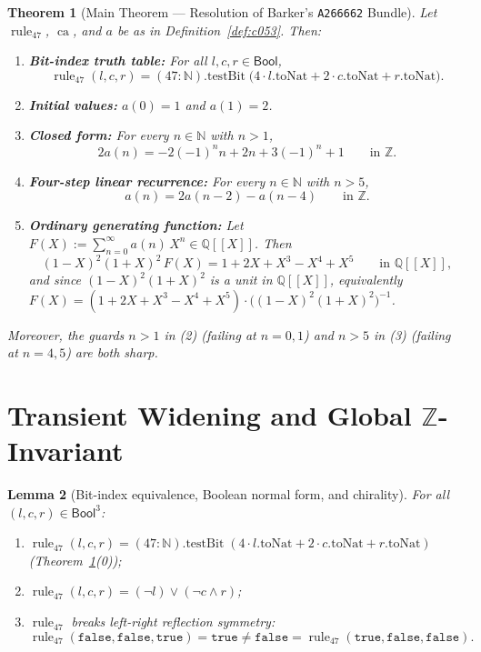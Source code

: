 \documentclass[11pt]{article}
\newcommand{\llbracket}{[\![}
\newcommand{\rrbracket}{]\!]}
\newtheorem{theorem}{Theorem}[section]
\newtheorem{lemma}[theorem]{Lemma}
\theoremstyle{definition}
\newcommand{\N}{\mathbb{N}}
\newcommand{\Z}{\mathbb{Z}}
\newcommand{\Q}{\mathbb{Q}}
\newcommand{\seq}[1]{\texttt{#1}}
\newcommand{\ruleFS}{\operatorname{rule}_{47}}
\newcommand{\ca}{\operatorname{ca}}
\begin{document}
\begin{theorem}[Main Theorem --- Resolution of Barker's \seq{A266662} Bundle]
\label{thm:main}
Let $\ruleFS$, $\ca$, and $a$ be as in Definition~\ref{def:c053}. Then:
\begin{enumerate}
\item[\textup{(0)}] \textbf{Bit-index truth table:} For all $l, c, r \in \mathsf{Bool}$,
\[
\ruleFS(l, c, r) = (47 : \N).\mathrm{testBit}\;\bigl(4 \cdot l.\mathrm{toNat} + 2 \cdot c.\mathrm{toNat} + r.\mathrm{toNat}\bigr).
\]
\item[\textup{(1)}] \textbf{Initial values:} $a(0) = 1$ and $a(1) = 2$.
\item[\textup{(2)}] \textbf{Closed form:} For every $n \in \N$ with $n > 1$,
\[
2 a(n) = -2(-1)^n n + 2n + 3(-1)^n + 1 \qquad \text{in }\Z.
\]
\item[\textup{(3)}] \textbf{Four-step linear recurrence:} For every $n \in \N$ with $n > 5$,
\[
a(n) = 2a(n - 2) - a(n - 4) \qquad \text{in }\Z.
\]
\item[\textup{(4)}] \textbf{Ordinary generating function:} Let $F(X) := \sum_{n=0}^{\infty} a(n)\,X^n \in \Q\llbracket X \rrbracket$. Then
\[
(1 - X)^2 (1 + X)^2 \, F(X) = 1 + 2X + X^3 - X^4 + X^5 \qquad \text{in }\Q\llbracket X \rrbracket,
\]
and since $(1 - X)^2(1 + X)^2$ is a unit in $\Q\llbracket X \rrbracket$, equivalently $F(X) = (1 + 2X + X^3 - X^4 + X^5)\cdot \bigl((1 - X)^2(1 + X)^2\bigr)^{-1}$.
\end{enumerate}
Moreover, the guards $n > 1$ in \textup{(2)} (failing at $n = 0, 1$) and $n > 5$ in \textup{(3)} (failing at $n = 4, 5$) are both sharp.
\end{theorem}

\section{Transient Widening and Global \texorpdfstring{$\Z$}{Z}-Invariant}

\begin{lemma}[Bit-index equivalence, Boolean normal form, and chirality]
\label{lem:rule47}
For all $(l, c, r) \in \mathsf{Bool}^3$:
\begin{enumerate}
\item[\textup{(a)}] $\ruleFS(l, c, r) = (47 : \N).\mathrm{testBit}\;(4 \cdot l.\mathrm{toNat} + 2 \cdot c.\mathrm{toNat} + r.\mathrm{toNat})$ (Theorem~\ref{thm:main}\textup{(0)});
\item[\textup{(b)}] $\ruleFS(l, c, r) = (\neg l) \lor (\neg c \land r)$;
\item[\textup{(c)}] $\ruleFS$ breaks left-right reflection symmetry:
\[
\ruleFS(\mathtt{false}, \mathtt{false}, \mathtt{true}) = \mathtt{true} \ne \mathtt{false} = \ruleFS(\mathtt{true}, \mathtt{false}, \mathtt{false}).
\]
\end{enumerate}
\end{lemma}
\end{document}

